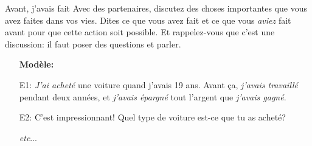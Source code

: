 \begin{frame}{Avant, j'avais fait}
  Avec des partenaires, discutez des choses importantes que vous avez faites dans vos vies.
  Dites ce que vous avez fait \alert{et} ce que vous \emph{aviez} fait avant pour que cette action soit possible.
  Et rappelez-vous que c'est une discussion: il faut poser des questions et parler.
  \begin{itemize}
    \item[] \textbf{Modèle:}
    \item[E1:] \emph{J'ai acheté} une voiture quand j'avais 19 ans. Avant ça, \emph{j'avais travaillé} pendant deux années, et \emph{j'avais épargné} tout l'argent que \emph{j'avais gagné}.
    \item[E2:] C'est impressionnant! Quel type de voiture est-ce que tu as acheté?
    \item[] \emph{etc}...
  \end{itemize}
\end{frame}